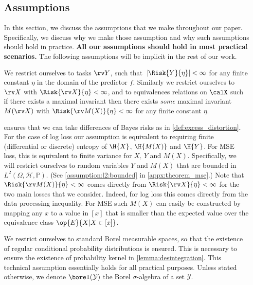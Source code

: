 \documentclass[final]{article}
\begin{document}
\subsection{Assumptions}
\label{appx:assumptions}


In this section, we discuss the assumptions that we make throughout our paper. 
Specifically, we discuss why we make those assumption and why such assumptions should hold in practice.
\textbf{All our assumptions should hold in most practical scenarios.}
The following assumptions will be implicit in the rest of our work.



\begin{assumption}
\label{assumption:variance}
We restrict ourselves to tasks $\rv Y$, such that\  $|\Risk{Y}{\eta}| < \infty$ for any finite constant $\eta$ in the domain of the predictor $f$.
Similarly we restrict ourselves to $\rv X$ with $\Risk{\rv X}{\eta} < \infty$, and to equivalences relations on $\calX$ such if there exists a maximal invariant then there exists \textit{some} maximal invariant $M(\rv X)$ with $\Risk{\rv M(X)}{\eta} < \infty$ for any finite constant $\eta$.
\end{assumption}

 ensures that we can take differences of Bayes risks as in \cref{def:excess_distortion}.
For the case of log loss our assumption is equivalent to requiring finite (differential or discrete) entropy of $\H{X}$, $\H{M(X)}$ and $\H{Y}$.
For MSE loss, this is equivalent to finite variance for $X$, $Y$ and $M(X)$. Specifically, we will restrict ourselves to random variables $Y$ and $M(X)$ that are bounded in $L^2(\Omega, \mathcal{H}, \mathbb{P})$. (See \cref{assumption:l2:bounded} in \cref{appx:theorem_mse}.)
Note that $\Risk{\rv M(X)}{\eta} < \infty$ comes directly from $\Risk{\rv X}{\eta} < \infty$ for the two main losses that we consider.
Indeed, for log loss this comes directly from the data processing inequality.
For MSE such $M(X)$ can easily be constructed by mapping any $x$ to a value in $[x]$ that is smaller than the expected value over the equivalence class $\op{E}{X | X \in [x]}$.

\begin{assumption} 
\label{assumption:regular} 
We restrict ourselves to standard Borel measurable spaces, so that the existence of regular conditional probability distributions is ensured. 
This is necessary to ensure the existence of probability kernel in \cref{lemma:desintegration}. 
This technical assumption essentially holds for all practical purposes. Unless stated otherwise, we denote $\borel(\mathcal{Y})$ the Borel $\sigma$-algebra of a set $\mathcal{Y}$.
\end{assumption}
\end{document}
